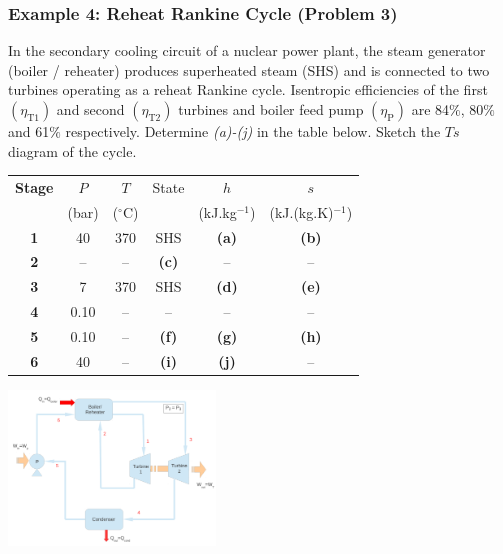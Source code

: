 \documentclass[10pt,compress]{beamer}
\begin{document}
\begin{frame}
 \frametitle{Example 4: Reheat Rankine Cycle (Problem 3)}
    \scriptsize In the secondary cooling circuit of a nuclear power plant, the steam generator (boiler / reheater) produces superheated steam (SHS) and is connected to two turbines operating as a reheat Rankine cycle. Isentropic efficiencies of the first $\left(\eta_{\text{T1}}\right)$ and second $\left(\eta_{\text{T2}}\right)$ turbines and boiler feed pump $\left(\eta_{\text{P}}\right)$ are 84$\%$, 80$\%$ and 61$\%$ respectively. Determine {\it (a)-(j)} in the table below. Sketch the $Ts$ diagram of the cycle.

       \begin{center}
         \begin{tabular}{c | c c c c c  }
           \hline
           {\bf Stage} & $P$    & $T$             &  State            & $h$                 & $s$                      \\
                       & (bar)  & ($^{\circ}$C)    &                   & (kJ.kg$^{-1}$)       & (kJ.(kg.K)$^{-1}$)        \\
           \hline
            {\bf 1 }   & 40         & 370         & SHS               & {\bf (a)}           & {\bf (b)}                 \\
            {\bf 2 }   &  --        &  --         & {\bf (c)}         & --                  &   --                      \\
            {\bf 3 }   & 7          & 370         & SHS               & {\bf (d)}           & {\bf (e)}                 \\
            {\bf 4 }   & 0.10       & --          &     --            & --                   & --                      \\
            {\bf 5 }   & 0.10       & --          &   {\bf (f)}       & {\bf (g)}           & {\bf (h)}                 \\
            {\bf 6 }   & 40         & --          &   {\bf (i)}       & {\bf (j)}           & --                       \\
           \hline
         \end{tabular}
        \end{center}
         \begin{center}
            \includegraphics[width=5.5cm,clip]{./Pics/Exam_Reheat_Rankine_Cycle}
         \end{center}


  
\end{frame} 
\end{document}
